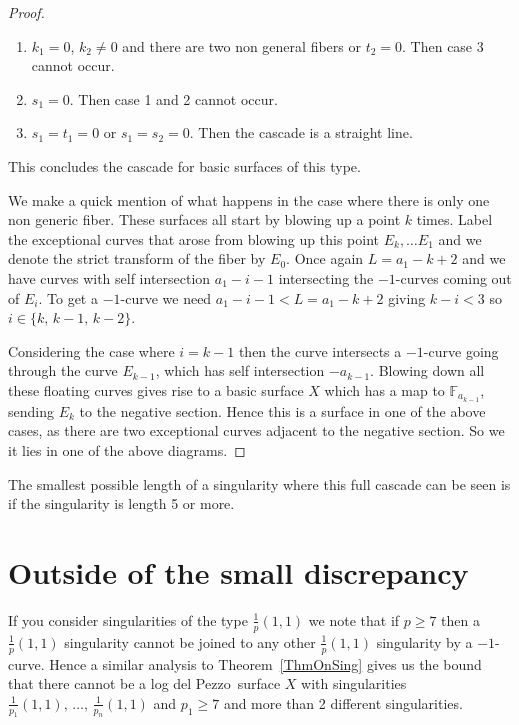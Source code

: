 \documentclass[12pt,a4paper]{book}      %
\theoremstyle{definition}
\newcommand{\ldp}{log del Pezzo}
\newcommand{\mb}[1]{\mathbb{#1}}
\begin{document}
\begin{proof}
\begin{enumerate}
\item $k_1 = 0$, $k_2 \neq 0$ and there are two non general fibers or $t_2 = 0$. Then case 3 cannot occur.

\item $s_1 = 0$. Then case 1 and 2 cannot occur. 

\item $s_1 = t_1 = 0$ or $s_1 = s_2 = 0$. Then the cascade is a straight line. 
\end{enumerate}
This concludes the cascade for basic surfaces of this type. 

We make a quick mention of what happens in the case where there is only one non generic fiber. These surfaces all start by blowing up a point $k$ times. Label the exceptional curves that arose from blowing up this point $E_{k}, \dots E_1$ and we denote the strict transform of the fiber by $E_{0}$. Once again $L = a_1 - k+ 2$ and we have curves with self intersection $a_1 - i -1$ intersecting the $-1$-curves coming out of $E_i$. To get a $-1$-curve we need $a_1 - i - 1 < L = a_1 - k+2$ giving $k-i < 3$ so $i \in \{ k, \, k-1,\, k-2 \}$. 

Considering the case where $i = k-1$ then the curve intersects a $-1$-curve going through the curve $E_{k-1}$, which has self intersection $-a_{k-1}$. Blowing down all these floating curves gives rise to a basic surface $X$ which has a map to $\mb{F}_{a_{k-1}}$, sending $E_k$ to the negative section. Hence this is a surface in one of the above cases, as there are two exceptional curves adjacent to the negative section. So we it lies in one of the above diagrams.
\end{proof}

The smallest possible length of a singularity where this full cascade can be seen is if the singularity is length 5 or more.

\section{Outside of the small discrepancy}

If you consider singularities of the type $\frac{1}{p}(1,1)$ we note that if $p \geq 7$ then a $\frac{1}{p}(1,1)$ singularity cannot be joined to any other $\frac{1}{p}(1,1)$ singularity by a $-1$-curve. Hence a similar analysis to  Theorem~\ref{ThmOnSing} gives us the bound that there cannot be a \ldp\ surface $X$ with singularities $\frac{1}{p_1}(1,1), \, \dots, \, \frac{1}{p_n}(1,1)$ and $p_1 \geq 7$ and more than 2 different singularities.
\end{document}
